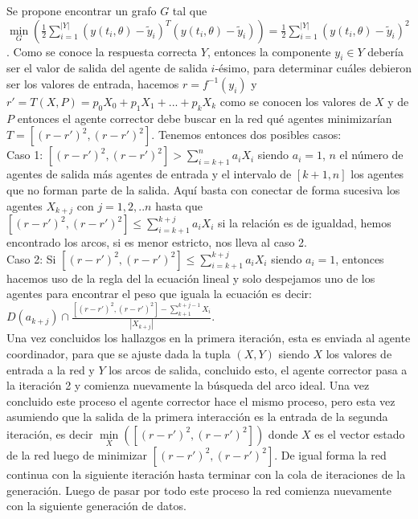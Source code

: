         Se propone encontrar un grafo $G$ tal que $\underset{G}{\min}(\frac{1}{2} \sum_{i=1}^{|Y|} (y(t_i, \theta) - \tilde{y}_i)^T (y(t_i,    \theta) - \tilde{y}_i))= \frac{1}{2} \sum_{i=1}^{|Y|} (y(t_i, \theta) - \tilde{y}_i)^2$.
         Como se conoce la respuesta correcta $Y$, entonces la componente $y_i \in Y$ debería ser el valor de salida del agente de salida $i$-ésimo, para determinar cuáles debieron ser los valores de entrada, hacemos $r=f^{-1}(y_i)$ y $r'=T(X,P)=p_0X_0 + p_1X_1 +...+p_kX_k$ como se conocen los valores de $X$ y de $P$
        entonces el agente corrector debe buscar en la red qué agentes minimizarían $T=[(r-r')^2,(r-r')^2]$. Tenemos entonces dos posibles casos: \\

        Caso 1: $[(r-r')^2,(r-r')^2] > \sum_{i=k+1}^{n} a_iX_i$ siendo $a_i=1$, $n$ el número de agentes de salida más agentes de entrada y el intervalo de $[k+1,n]$ los agentes
        que no forman parte de la salida. Aquí basta con conectar de forma sucesiva los agentes $X_{k+j}$ con $j=1,2,..n$ hasta que $[(r-r')^2,(r-r')^2] \leqslant \sum_{i=k+1}^{k+j} a_iX_i$ si la relación es de igualdad, hemos encontrado los arcos,
         si es menor estricto, nos lleva al caso 2.\\

        Caso 2: Si $[(r-r')^2,(r-r')^2] \leqslant \sum_{i=k+1}^{k+j} a_iX_i$ siendo $a_i=1$, entonces hacemos uso de la regla del la ecuación lineal y solo despejamos uno de los agentes para encontrar el peso que iguala la ecuación
        es decir: $D(a_{k+j}) \cap \frac{[(r-r')^2,(r-r')^2] - \sum_{k+1}^{k+j-1} X_i}{|X_{k+j}|}$.\\

        Una vez concluidos los hallazgos en la primera iteración, esta es enviada al agente coordinador, para que se ajuste dada la tupla $(X,Y)$ siendo
        $X$ los valores de entrada a la red y $Y$ los arcos de salida, concluido esto, el agente corrector pasa a la iteración 2 y comienza nuevamente la búsqueda del arco ideal. Una vez concluido este proceso
        el agente corrector hace el mismo proceso, pero esta vez asumiendo que la salida de la primera interacción es la entrada de la segunda iteración, es decir $\underset{X}{\min}([(r-r')^2,(r-r')^2])$ donde $X$ es el vector estado de la red luego de minimizar $[(r-r')^2,(r-r')^2]$.
        De igual forma la red continua con la siguiente iteración hasta terminar con la cola de iteraciones de la generación. Luego de pasar por todo este proceso la red comienza nuevamente con la siguiente generación de datos. \\

